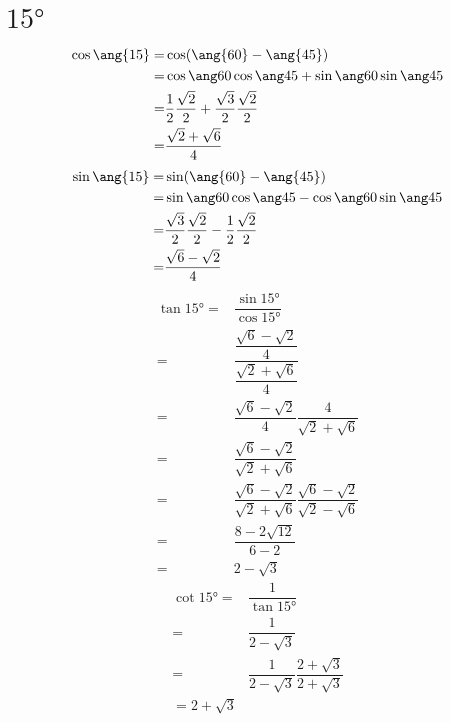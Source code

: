 \section{$\ang{15}$}
\begin{align*}
	\cos\ang{15}=&\cos(\ang{60}-\ang{45})\\
	=&\difcos{60}{45}\\
	=&\cossessanta\cosquarantacinque+\sinsessanta\sinquarantecinque\\
	=&\dfrac{\sqrt{2}+\sqrt{6}}{4}\\
\end{align*}
\begin{align*}
	\sin\ang{15}=&\sin(\ang{60}-\ang{45})\\
	=&\difsin{60}{45}\\
	=&\sinsessanta\cosquarantacinque-\cossessanta\sinquarantecinque\\
	=&\dfrac{\sqrt{6}-\sqrt{2}}{4}
\end{align*}
\begin{align*}
	\tan\ang{15}=&\dfrac{\sin\ang{15}}{\cos\ang{15}}\\
	=&\dfrac{\dfrac{\sqrt{6}-\sqrt{2}}{4}}{\dfrac{\sqrt{2}+\sqrt{6}}{4}}\\
	=&\dfrac{\sqrt{6}-\sqrt{2}}{4}\dfrac{4}{\sqrt{2}+\sqrt{6}}\\
	=&\dfrac{\sqrt{6}-\sqrt{2}}{\sqrt{2}+\sqrt{6}}\\
	=&\dfrac{\sqrt{6}-\sqrt{2}}{\sqrt{2}+\sqrt{6}}\dfrac{\sqrt{6}-\sqrt{2}}{\sqrt{2}-\sqrt{6}}\\
	=&\dfrac{8-2\sqrt{12}}{6-2}\\
	=&2-\sqrt{3}
\end{align*}
\begin{align*}
	\cot\ang{15}=&\dfrac{1}{\tan\ang{15}}\\
	=&\dfrac{1}{2-\sqrt{3}}\\
	=&\dfrac{1}{2-\sqrt{3}}\dfrac{2+\sqrt{3}}{2+\sqrt{3}}\\
	=2+\sqrt{3}\\
\end{align*}
